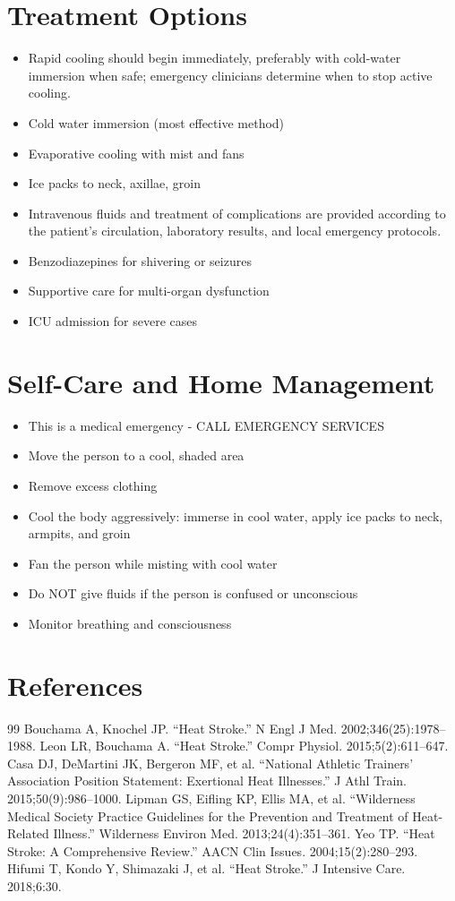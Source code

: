 \section*{Treatment Options}
\begin{itemize}
\item Rapid cooling should begin immediately, preferably with cold-water immersion when safe; emergency clinicians determine when to stop active cooling.
\item Cold water immersion (most effective method)
\item Evaporative cooling with mist and fans
\item Ice packs to neck, axillae, groin
\item Intravenous fluids and treatment of complications are provided according to the patient’s circulation, laboratory results, and local emergency protocols.
\item Benzodiazepines for shivering or seizures
\item Supportive care for multi-organ dysfunction
\item ICU admission for severe cases
\end{itemize}
\section*{Self-Care and Home Management}
\begin{itemize}
\item This is a medical emergency - CALL EMERGENCY SERVICES
\item Move the person to a cool, shaded area
\item Remove excess clothing
\item Cool the body aggressively: immerse in cool water, apply ice packs to neck, armpits, and groin
\item Fan the person while misting with cool water
\item Do NOT give fluids if the person is confused or unconscious
\item Monitor breathing and consciousness
\end{itemize}

\section*{References}
\begin{thebibliography}{99}
 Bouchama A, Knochel JP. ``Heat Stroke.'' N Engl J Med. 2002;346(25):1978--1988.
 Leon LR, Bouchama A. ``Heat Stroke.'' Compr Physiol. 2015;5(2):611--647.
 Casa DJ, DeMartini JK, Bergeron MF, et al. ``National Athletic Trainers' Association Position Statement: Exertional Heat Illnesses.'' J Athl Train. 2015;50(9):986--1000.
 Lipman GS, Eifling KP, Ellis MA, et al. ``Wilderness Medical Society Practice Guidelines for the Prevention and Treatment of Heat-Related Illness.'' Wilderness Environ Med. 2013;24(4):351--361.
 Yeo TP. ``Heat Stroke: A Comprehensive Review.'' AACN Clin Issues. 2004;15(2):280--293.
 Hifumi T, Kondo Y, Shimazaki J, et al. ``Heat Stroke.'' J Intensive Care. 2018;6:30.
\end{thebibliography}

